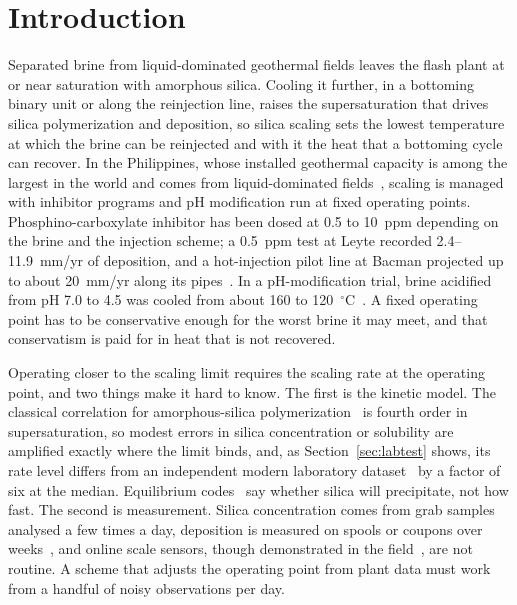\section{Introduction}\label{sec:intro}

Separated brine from liquid-dominated geothermal fields leaves the flash
plant at or near saturation with amorphous silica. Cooling it further,
in a bottoming binary unit or along the reinjection line, raises the
supersaturation that drives silica polymerization and deposition, so
silica scaling sets the lowest temperature at which the brine can be
reinjected and with it the heat that a bottoming cycle can recover. In
the Philippines, whose installed geothermal capacity is among the
largest in the world and comes from liquid-dominated
fields~\citep{fronda2020country}, scaling is managed with inhibitor
programs and pH modification run at fixed operating points.
Phosphino-carboxylate inhibitor has been dosed at 0.5 to 10~ppm
depending on the brine and the injection scheme; a 0.5~ppm test at
Leyte recorded 2.4--11.9~mm/yr of deposition, and a hot-injection pilot
line at Bacman projected up to about 20~mm/yr along its
pipes~\citep{see2010wgc,baltazar2014grc}. In a pH-modification trial,
brine acidified from pH 7.0 to 4.5 was cooled from about 160 to
120~$^{\circ}$C~\citep{remoroza2008ph}. A fixed operating point has to
be conservative enough for the worst brine it may meet, and that
conservatism is paid for in heat that is not recovered.

Operating closer to the scaling limit requires the scaling rate at the
operating point, and two things make it hard to know. The first is the
kinetic model. The classical correlation for amorphous-silica
polymerization~\citep{rothbaum1979rohde} is fourth order in
supersaturation, so modest errors in silica concentration or solubility
are amplified exactly where the limit binds, and, as
Section~\ref{sec:labtest} shows, its rate level differs from an
independent modern laboratory dataset~\citep{scott2024silica} by a
factor of six at the median. Equilibrium codes~\citep{parkhurst2013phreeqc}
say whether silica will precipitate, not how fast. The second is
measurement. Silica concentration comes from grab samples analysed a
few times a day, deposition is measured on spools or coupons over
weeks~\citep{baltazar2014grc}, and online scale sensors, though
demonstrated in the field~\citep{okazaki2017fiber}, are not routine. A
scheme that adjusts the operating point from plant data must work from
a handful of noisy observations per day.

